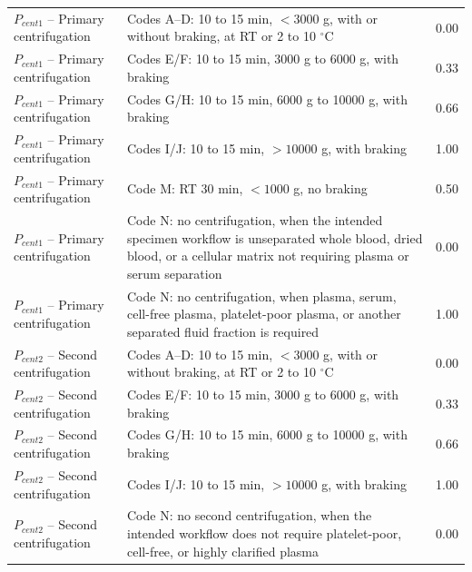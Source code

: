 \documentclass[preprint,12pt]{elsarticle}
\begin{document}
\begin{longtable}{@{}p{3.0cm}p{8.2cm}p{1.2cm}@{}}
\(P_{cent1}\) -- Primary centrifugation
& Codes A--D: 10 to 15 min, \(<3000\) g, with or without braking, at RT or 2 to 10 \(^{\circ}\)C
& 0.00 \\

\(P_{cent1}\) -- Primary centrifugation
& Codes E/F: 10 to 15 min, 3000 g to 6000 g, with braking
& 0.33 \\

\(P_{cent1}\) -- Primary centrifugation
& Codes G/H: 10 to 15 min, 6000 g to 10000 g, with braking
& 0.66 \\

\(P_{cent1}\) -- Primary centrifugation
& Codes I/J: 10 to 15 min, \(>10000\) g, with braking
& 1.00 \\

\(P_{cent1}\) -- Primary centrifugation
& Code M: RT 30 min, \(<1000\) g, no braking
& 0.50 \\

\(P_{cent1}\) -- Primary centrifugation
& Code N: no centrifugation, when the intended specimen workflow is unseparated whole blood, dried blood, or a cellular matrix not requiring plasma or serum separation
& 0.00 \\

\(P_{cent1}\) -- Primary centrifugation
& Code N: no centrifugation, when plasma, serum, cell-free plasma, platelet-poor plasma, or another separated fluid fraction is required
& 1.00 \\

\midrule

\(P_{cent2}\) -- Second centrifugation
& Codes A--D: 10 to 15 min, \(<3000\) g, with or without braking, at RT or 2 to 10 \(^{\circ}\)C
& 0.00 \\

\(P_{cent2}\) -- Second centrifugation
& Codes E/F: 10 to 15 min, 3000 g to 6000 g, with braking
& 0.33 \\

\(P_{cent2}\) -- Second centrifugation
& Codes G/H: 10 to 15 min, 6000 g to 10000 g, with braking
& 0.66 \\

\(P_{cent2}\) -- Second centrifugation
& Codes I/J: 10 to 15 min, \(>10000\) g, with braking
& 1.00 \\

\(P_{cent2}\) -- Second centrifugation
& Code N: no second centrifugation, when the intended workflow does not require platelet-poor, cell-free, or highly clarified plasma
& 0.00 \\


\end{longtable}
\end{document}
